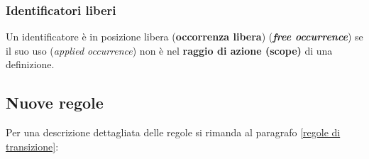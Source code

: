 \documentclass[a4paper]{article}
\begin{document}
	
	\subsubsection{Identificatori liberi}
	
	\begin{boxdef}
		Un identificatore è in posizione libera (\textcolor{Red3}{\textbf{occorrenza libera}}) (\textbf{\emph{free occurrence}}) se il suo uso (\emph{applied occurrence}) non è nel \textbf{raggio di azione (scope)} di una definizione.
	\end{boxdef}\newpage
	
	
	\subsection{Nuove regole}
	
	Per una descrizione dettagliata delle regole si rimanda al paragrafo \ref{regole di transizione}:
\end{document}
